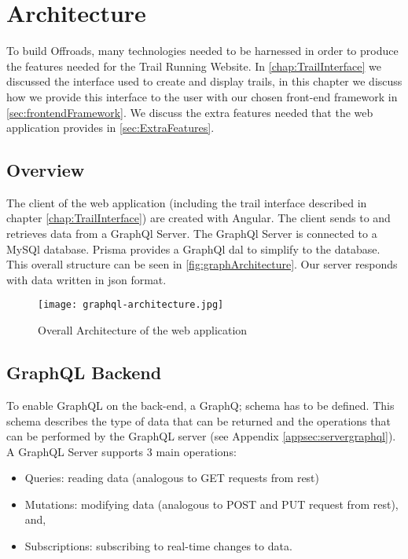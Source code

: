 \chapter{Architecture} \label{chap:Architecture}
To build Offroads, many technologies needed to be harnessed in order to produce the features needed for the Trail Running Website. In \autoref{chap:TrailInterface} we discussed the interface used to create and display trails, in this chapter we discuss how we provide this interface to the user with our chosen \Gls{front-end} framework in \autoref{sec:frontendFramework}. We discuss the extra features needed that the web application provides in \autoref{sec:ExtraFeatures}.

\section{Overview}
The client of the web application (including the trail interface described in chapter \ref{chap:TrailInterface}) are created with Angular. The client sends to and retrieves data from a GraphQl Server. The GraphQl Server is connected to a MySQl database. Prisma provides a GraphQl \acrfull{dal} to simplify to the database. This overall structure can be seen in \autoref{fig:graphArchitecture}. Our server responds with data written in \acrfull{json} format.


\begin{figure}[htb!]
    \centering
    \texttt{[image: graphql-architecture.jpg]}
    \caption{Overall Architecture of the web application \cite{graphqlStructure}}
    \label{fig:graphArchitecture}
\end{figure}


\section{GraphQL Backend}
To enable GraphQL on the \gls{back-end}, a GraphQ; schema has to be defined. This schema describes the type of data that can be returned and the operations that can be performed by the GraphQL server (see Appendix \ref{appsec:servergraphql}). A GraphQL Server supports 3 main operations:

\begin{itemize}
    \item Queries: reading data (analogous to GET requests from \acrshort{rest})
    \item Mutations: modifying data (analogous to POST and PUT request from \acrshort{rest}), and,
    \item Subscriptions: subscribing to real-time changes to data.
\end{itemize}

